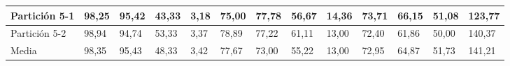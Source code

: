 \documentclass[10pt,a4paper]{article}
\begin{document}
\begin{table}[H]
{\begin{tabular}{l|l|l|l|l|l|l|l|l|l|l|l|l|}
\multicolumn{1}{|l|}{Partición 5-1} & 98,25        & 95,42         & 43,33   & 3,18 & 75,00        & 77,78         & 56,67   & 14,36 & 73,71        & 66,15         & 51,08   & 123,77 \\ \hline
\multicolumn{1}{|l|}{Partición 5-2} & 98,94        & 94,74         & 53,33   & 3,37 & 78,89        & 77,22         & 61,11   & 13,00 & 72,40        & 61,86         & 50,00   & 140,37 \\ \hline
\multicolumn{1}{|l|}{Media}         & 98,35        & 95,43         & 48,33   & 3,42 & 77,67        & 73,00         & 55,22   & 13,00 & 72,95        & 64,87         & 51,73   & 141,21 \\ \hline
\end{tabular}}
\end{table}

\end{document}
